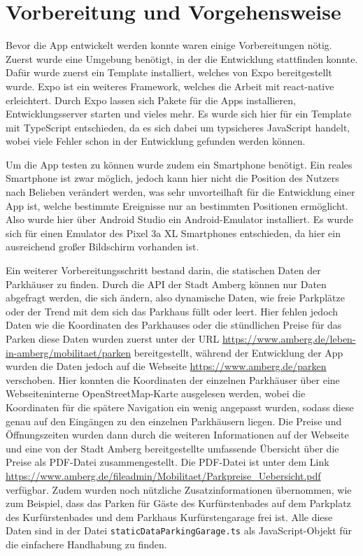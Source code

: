 \chapter{Vorbereitung und Vorgehensweise}
\label{chap:2}

Bevor die App entwickelt werden konnte waren einige Vorbereitungen nötig. Zuerst wurde eine Umgebung benötigt, in der die Entwicklung stattfinden konnte. Dafür wurde zuerst ein Template installiert, welches von Expo bereitgestellt wurde\cite{expo}. Expo ist ein weiteres Framework, welches die Arbeit mit react-native erleichtert. Durch Expo lassen sich Pakete für die Apps installieren, Entwicklungsserver starten und vieles mehr. Es wurde sich hier für ein Template mit TypeScript entschieden, da es sich dabei um typsicheres JavaScript handelt, wobei viele Fehler schon in der Entwicklung gefunden werden können.

Um die App testen zu können wurde zudem ein Smartphone benötigt. Ein reales Smartphone ist zwar möglich, jedoch kann hier nicht die Position des Nutzers nach Belieben verändert werden, was sehr unvorteilhaft für die Entwicklung einer App ist, welche bestimmte Ereignisse nur an bestimmten Positionen ermöglicht. Also wurde hier über Android Studio ein Android-Emulator installiert. Es wurde sich für einen Emulator des Pixel 3a XL Smartphones entschieden, da hier ein ausreichend großer Bildschirm vorhanden ist.

Ein weiterer Vorbereitungsschritt bestand darin, die statischen Daten der Parkhäuser zu finden. Durch die API der Stadt Amberg können nur Daten abgefragt werden, die sich ändern, also dynamische Daten, wie freie Parkplätze oder der Trend mit dem sich das Parkhaus füllt oder leert. Hier fehlen jedoch Daten wie die Koordinaten des Parkhauses oder die stündlichen Preise für das Parken diese Daten wurden zuerst unter der URL \url{https://www.amberg.de/leben-in-amberg/mobilitaet/parken} bereitgestellt, während der Entwicklung der App wurden die Daten jedoch auf die Webseite \url{https://www.amberg.de/parken} verschoben. Hier konnten die Koordinaten der einzelnen Parkhäuser über eine Webseiteninterne OpenStreetMap-Karte ausgelesen werden, wobei die Koordinaten für die spätere Navigation ein wenig angepasst wurden, sodass diese genau auf den Eingängen zu den einzelnen Parkhäusern liegen. Die Preise und Öffnungszeiten wurden dann durch die weiteren Informationen auf der Webseite und eine von der Stadt Amberg bereitgestellte umfassende Übersicht über die Preise als PDF-Datei zusammengestellt. Die PDF-Datei ist unter dem Link \url{https://www.amberg.de/fileadmin/Mobilitaet/Parkpreise_Uebersicht.pdf} verfügbar. Zudem wurden noch nützliche Zusatzinformationen übernommen, wie zum Beispiel, dass das Parken für Gäste des Kurfürstenbades auf dem Parkplatz des Kurfürstenbades und dem Parkhaus Kurfürstengarage frei ist. Alle diese Daten sind in der Datei \verb|staticDataParkingGarage.ts| als JavaScript-Objekt für die einfachere Handhabung zu finden.

